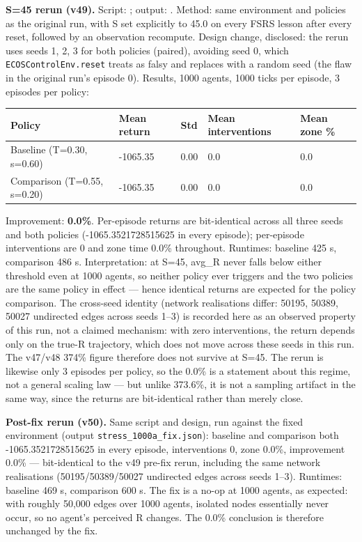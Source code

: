 \documentclass[11pt]{article}
\begin{document}
\textbf{S=45 rerun (v49).} Script: ; output: . Method: same environment and policies as the original run, with S set explicitly to 45.0 on every FSRS lesson after every reset, followed by an observation recompute. Design change, disclosed: the rerun uses seeds 1, 2, 3 for both policies (paired), avoiding seed 0, which \texttt{ECOSControlEnv.reset} treats as falsy and replaces with a random seed (the flaw in the original run's episode 0). Results, 1000 agents, 1000 ticks per episode, 3 episodes per policy:

\begin{table}[htbp]
\centering
\begin{tabular}{lllll}
\toprule
\textbf{Policy} & \textbf{Mean return} & \textbf{Std} & \textbf{Mean interventions} & \textbf{Mean zone \%} \\
\midrule
Baseline (T=0.30, s=0.60) & -1065.35 & 0.00 & 0.0 & 0.0 \\
Comparison (T=0.55, s=0.20) & -1065.35 & 0.00 & 0.0 & 0.0 \\
\bottomrule
\end{tabular}
\end{table}

Improvement: \textbf{0.0\%}. Per-episode returns are bit-identical across all three seeds and both policies (-1065.3521728515625 in every episode); per-episode interventions are 0 and zone time 0.0\% throughout. Runtimes: baseline 425 s, comparison 486 s. Interpretation: at S=45, avg\_R never falls below either threshold even at 1000 agents, so neither policy ever triggers and the two policies are the same policy in effect --- hence identical returns are expected for the policy comparison. The cross-seed identity (network realisations differ: 50195, 50389, 50027 undirected edges across seeds 1--3) is recorded here as an observed property of this run, not a claimed mechanism: with zero interventions, the return depends only on the true-R trajectory, which does not move across these seeds in this run. The v47/v48 374\% figure therefore does not survive at S=45. The rerun is likewise only 3 episodes per policy, so the 0.0\% is a statement about this regime, not a general scaling law --- but unlike 373.6\%, it is not a sampling artifact in the same way, since the returns are bit-identical rather than merely close.

\textbf{Post-fix rerun (v50).} Same script and design, run against the fixed environment (output \texttt{stress\_1000a\_fix.json}): baseline and comparison both -1065.3521728515625 in every episode, interventions 0, zone 0.0\%, improvement 0.0\% --- bit-identical to the v49 pre-fix rerun, including the same network realisations (50195/50389/50027 undirected edges across seeds 1--3). Runtimes: baseline 469 s, comparison 600 s. The fix is a no-op at 1000 agents, as expected: with roughly 50,000 edges over 1000 agents, isolated nodes essentially never occur, so no agent's perceived R changes. The 0.0\% conclusion is therefore unchanged by the fix.
\end{document}
